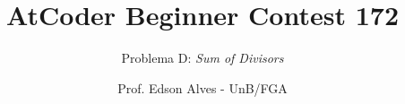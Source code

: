 \title{AtCoder Beginner Contest 172}
\subtitle{Problema D: {\it Sum of Divisors}}
\author{Prof. Edson Alves - UnB/FGA}
\date{}
